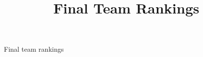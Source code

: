 \documentclass[11pt, oneside]{article}   	%
\title{Final Team Rankings}
\date{}
\begin{document}
\thispagestyle{empty}
\begin{landscape}
\begin{table}[htbp] %
   \centering
   \caption{Final team rankings}
   \scalebox{0.75}{}
   \label{tab:table}
\end{table}
\end{landscape}
\restoregeometry
\end{document}
